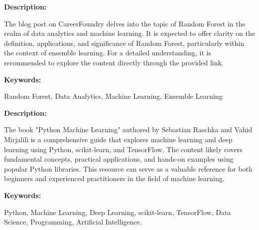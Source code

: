 { 
	
	\textbf{Description:}
	
	The blog post on CareerFoundry delves into the topic of Random Forest in the realm of data analytics and machine learning. It is expected to offer clarity on the definition, applications, and significance of Random Forest, particularly within the context of ensemble learning. For a detailed understanding, it is recommended to explore the content directly through the provided link.\autocite{RachaelMeltzer.2021}

	
	
	
	\textbf{Keywords:} 
	
	Random Forest, Data Analytics, Machine Learning, Ensemble Learning


	
}










{ 
	
	\textbf{Description:}
	
	The book "Python Machine Learning" authored by Sebastian Raschka and Vahid Mirjalili is a comprehensive guide that explores machine learning and deep learning using Python, scikit-learn, and TensorFlow. The content likely covers fundamental concepts, practical applications, and hands-on examples using popular Python libraries. This resource can serve as a valuable reference for both beginners and experienced practitioners in the field of machine learning.\autocite{Raschka:2017}

	
	
	
	
	\textbf{Keywords:} 
	
	Python, Machine Learning, Deep Learning, scikit-learn, TensorFlow, Data Science, Programming, Artificial Intelligence.

	
	
	
}







